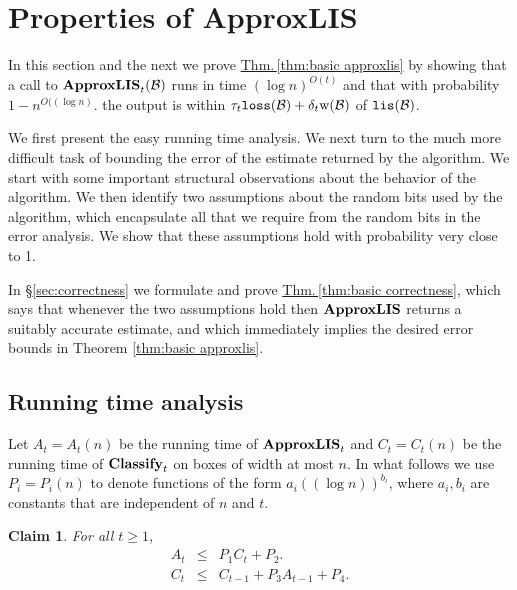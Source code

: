 \documentclass{acmsmall}
\newtheorem{claim}[theorem]{Claim}
\newcommand{\cB}{{\cal B}}
\newcommand{\Sec}[1]{\hyperref[sec:#1]{\S\ref*{sec:#1}}} %
\newcommand{\Thm}[1]{\hyperref[thm:#1]{Thm.\,\ref*{thm:#1}}} %
\newcommand{\lis}{{\tt lis}}
\newcommand{\loss}{{\tt loss}}
\newcommand{\width}{{\bf {\rm  w}}}
\newcommand{\classify}{{\rm {\bf Classify}}}
\newcommand{\approxlis}{{\rm {\bf ApproxLIS}}}
\begin{document}
\section{Properties of \approxlis}

In this section and the next we prove \Thm{basic approxlis} by showing that
a call to $\approxlis_t(\cB)$ runs in time
$(\log n)^{O(t)}$ and that with probability $1-n^{O((\log n)}$.   the output
is within $\tau_t \loss(\cB)+ \delta_t \width(\cB)$ of $\lis(\cB)$.

We first present the easy running time analysis.  We next turn to the much more difficult task of  
bounding the error of the estimate returned by the algorithm. We start with 
some important structural observations about the behavior of the algorithm. We then
identify two assumptions about the random bits used by the algorithm, which encapsulate 
all that we require from the random bits in the error analysis.  We show that these
assumptions hold with probability very close to 1.

In \Sec{correctness} 
we  formulate and prove \Thm{basic correctness}, which says
that whenever the two assumptions hold then $\approxlis$ returns a suitably accurate estimate, and which immediately
implies the desired error bounds in Theorem \ref{thm:basic approxlis}.
  
\subsection{Running time analysis}
\label{subsec:running time}

Let $A_t=A_t(n)$ be the running time of $\approxlis_t$  and
$C_t=C_t(n)$ be the running time of $\classify_t$ on boxes of width at most $n$.
In what follows we use $P_i=P_i(n)$ to denote functions of the form $a_i ((\log n))^{b_i}$, where $a_i,b_i$ are constants that
are independent of $n$ and $t$.  


\begin{claim} \label{clm:runtime} For all $t \geq 1$,
\begin{eqnarray*}
A_t & \leq & P_1 C_t + P_2. \\
C_t & \leq & C_{t-1}+ P_3 A_{t-1}+P_4.
\end{eqnarray*}
\end{claim}
\end{document}
